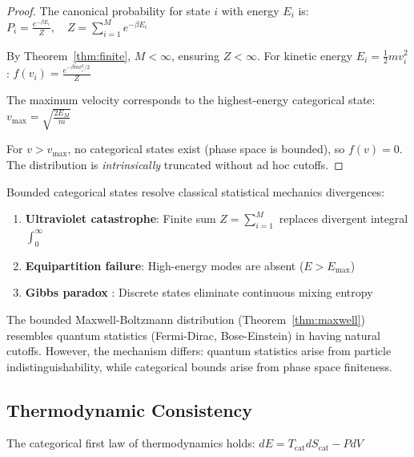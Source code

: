 \begin{proof}
The canonical probability for state $i$ with energy $E_i$ is:
$
P_i = \frac{e^{-\beta E_i}}{Z}, \quad Z = \sum_{i=1}^{M} e^{-\beta E_i}
$

By Theorem~\ref{thm:finite}, $M < \infty$, ensuring $Z < \infty$. For kinetic energy $E_i = \frac{1}{2}mv_i^2$:
$
f(v_i) = \frac{e^{-\beta m v_i^2/2}}{Z}
$

The maximum velocity corresponds to the highest-energy categorical state:
$
v_{\max} = \sqrt{\frac{2E_M}{m}}
$

For $v > v_{\max}$, no categorical states exist (phase space is bounded), so $f(v) = 0$. The distribution is \emph{intrinsically} truncated without ad hoc cutoffs.
\end{proof}

\begin{corollary}
\label{cor:divergence}
Bounded categorical states resolve classical statistical mechanics divergences:
\begin{enumerate}
    \item \textbf{Ultraviolet catastrophe}: Finite sum $Z = \sum_{i=1}^{M}$ replaces divergent integral $\int_0^\infty$
    \item \textbf{Equipartition failure}: High-energy modes are absent ($E > E_{\max}$)
    \item \textbf{Gibbs paradox} \citep{jaynes1992gibbs,swendsen2006statistical}: Discrete states eliminate continuous mixing entropy
\end{enumerate}
\end{corollary}

\begin{remark}
The bounded Maxwell-Boltzmann distribution (Theorem~\ref{thm:maxwell}) resembles quantum statistics (Fermi-Dirac, Bose-Einstein) in having natural cutoffs. However, the mechanism differs: quantum statistics arise from particle indistinguishability, while categorical bounds arise from phase space finiteness.
\end{remark}

\subsection{Thermodynamic Consistency}

\begin{proposition}
\label{prop:first_law}
The categorical first law of thermodynamics holds:
$
dE = T_{\mathrm{cat}} dS_{\mathrm{cat}} - P dV
$
\end{proposition}

